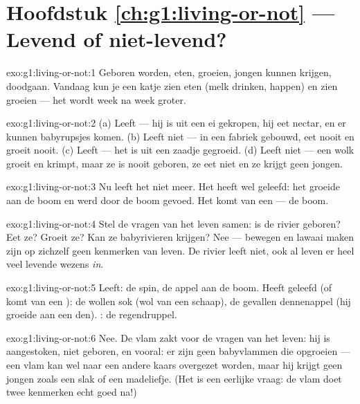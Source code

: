 \section*{Hoofdstuk \ref{ch:g1:living-or-not} --- Levend of niet-levend?}

\begin{solution}{exo:g1:living-or-not:1}
Geboren worden, eten, groeien, jongen kunnen krijgen, doodgaan.
Vandaag kun je een katje zien eten (melk drinken, happen) en zien
groeien --- het wordt week na week groter.
\end{solution}

\begin{solution}{exo:g1:living-or-not:2}
(a) Leeft --- hij is uit een ei gekropen, hij eet nectar, en er kunnen
babyrupsjes komen. (b) Leeft niet --- in een fabriek gebouwd, eet
nooit en groeit nooit. (c) Leeft --- het is uit een zaadje gegroeid.
(d) Leeft niet --- een wolk groeit en krimpt, maar ze is nooit geboren,
ze eet niet en ze krijgt geen jongen.
\end{solution}

\begin{solution}{exo:g1:living-or-not:3}
Nu leeft het niet meer. Het heeft wel geleefd: het groeide aan de boom
en werd door de boom gevoed. Het komt van een  --- de boom.
\end{solution}

\begin{solution}{exo:g1:living-or-not:4}
Stel de vragen van het leven samen: is de rivier geboren? Eet ze?
Groeit ze? Kan ze babyrivieren krijgen? Nee --- bewegen en lawaai
maken zijn op zichzelf geen kenmerken van leven. De rivier leeft niet,
ook al leven er heel veel levende wezens \emph{in}.
\end{solution}

\begin{solution}{exo:g1:living-or-not:5}
Leeft: de spin, de appel aan de boom. Heeft geleefd (of komt van een
): de wollen sok (wol van een schaap), de gevallen
dennenappel (hij groeide aan een den). : de regendruppel.
\end{solution}

\begin{solution}{exo:g1:living-or-not:6}
Nee. De vlam zakt voor de vragen van het leven: hij is aangestoken,
niet geboren, en vooral: er zijn geen babyvlammen die opgroeien --- een
vlam kan wel naar een andere kaars overgezet worden, maar hij krijgt
geen jongen zoals een slak of een madeliefje. (Het is een eerlijke
vraag: de vlam doet twee kenmerken echt goed na!)
\end{solution}

